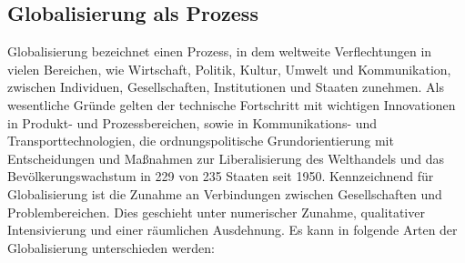 \documentclass[12pt]{article}
\begin{document}
\subsection{Globalisierung als Prozess}
Globalisierung bezeichnet einen Prozess, in dem weltweite Verflechtungen in vielen Bereichen, wie Wirtschaft, Politik, Kultur, Umwelt und Kommunikation, zwischen Individuen, Gesellschaften, Institutionen und Staaten zunehmen. Als wesentliche Gründe gelten der technische Fortschritt mit wichtigen Innovationen in Produkt- und Prozessbereichen, sowie in Kommunikations- und Transporttechnologien, die ordnungspolitische Grundorientierung mit Entscheidungen und Maßnahmen zur Liberalisierung des Welthandels und das Bevölkerungswachstum in 229 von 235 Staaten seit 1950. Kennzeichnend für Globalisierung ist die Zunahme an Verbindungen zwischen Gesellschaften und Problembereichen. Dies geschieht unter numerischer Zunahme, qualitativer Intensivierung und einer räumlichen Ausdehnung. Es kann in folgende Arten der Globalisierung unterschieden werden:
\end{document}
